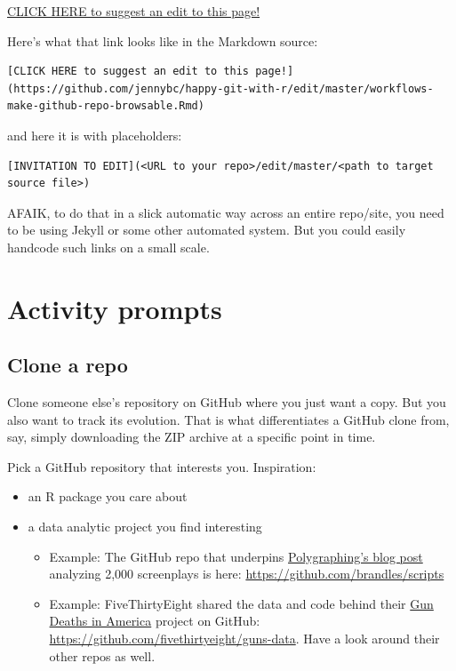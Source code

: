 \documentclass[
]{book}
\providecommand{\tightlist}{%
  \setlength{\itemsep}{0pt}\setlength{\parskip}{0pt}}
\begin{document}
\href{https://github.com/jennybc/happy-git-with-r/edit/master/workflows-make-github-repo-browsable.Rmd}{CLICK HERE to suggest an edit to this page!}

Here's what that link looks like in the Markdown source:

\begin{verbatim}
[CLICK HERE to suggest an edit to this page!](https://github.com/jennybc/happy-git-with-r/edit/master/workflows-make-github-repo-browsable.Rmd)
\end{verbatim}

and here it is with placeholders:

\begin{verbatim}
[INVITATION TO EDIT](<URL to your repo>/edit/master/<path to target source file>)
\end{verbatim}

AFAIK, to do that in a slick automatic way across an entire repo/site, you need to be using Jekyll or some other automated system. But you could easily handcode such links on a small scale.

\part{Activity prompts}\label{part-activity-prompts}

\chapter{Clone a repo}\label{clone}

Clone someone else's repository on GitHub where you just want a copy. But you also want to track its evolution. That is what differentiates a GitHub clone from, say, simply downloading the ZIP archive at a specific point in time.

Pick a GitHub repository that interests you. Inspiration:

\begin{itemize}
\tightlist
\item
  an R package you care about
\item
  a data analytic project you find interesting

  \begin{itemize}
  \tightlist
  \item
    Example: The GitHub repo that underpins \href{http://polygraph.cool/films/}{Polygraphing's blog post} analyzing 2,000 screenplays is here: \url{https://github.com/brandles/scripts}
  \item
    Example: FiveThirtyEight shared the data and code behind their \href{http://fivethirtyeight.com/gun-deaths/}{Gun Deaths in America} project on GitHub: \url{https://github.com/fivethirtyeight/guns-data}. Have a look around their other repos as well.
  \end{itemize}
\end{itemize}
\end{document}
